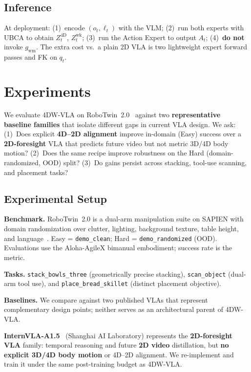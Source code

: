 \subsection{Inference}
\label{sec:inference}

At deployment: (1)~encode $(o_t, \ell_t)$ with the VLM; (2)~run both experts with UBCA to obtain $Z^{\mathrm{4D}}_t$, $Z^{\mathrm{wk}}_t$; (3)~run the Action Expert to output $A_t$; (4)~\textbf{do not} invoke $g_{\mathrm{wm}}$. The extra cost vs.\ a plain 2D VLA is two lightweight expert forward passes and FK on $q_t$.

\section{Experiments}
\label{sec:experiments}

We evaluate 4DW-VLA on RoboTwin~2.0~\cite{chen2025robotwin2} against two \textbf{representative baseline families} that isolate different gaps in current VLA design. We ask: (1)~Does explicit \textbf{4D--2D alignment} improve in-domain (Easy) success over a \textbf{2D-foresight} VLA that predicts future video but not metric 3D/4D body motion? (2)~Does the same recipe improve robustness on the Hard (domain-randomized, OOD) split? (3)~Do gains persist across stacking, tool-use scanning, and placement tasks?

\subsection{Experimental Setup}

\textbf{Benchmark.} RoboTwin~2.0 is a dual-arm manipulation suite on SAPIEN with domain randomization over clutter, lighting, background texture, table height, and language~\cite{chen2025robotwin2}. Easy = \texttt{demo\_clean}; Hard = \texttt{demo\_randomized} (OOD). Evaluations use the Aloha-AgileX bimanual embodiment; success rate is the metric.

\textbf{Tasks.} \texttt{stack\_bowls\_three} (geometrically precise stacking), \texttt{scan\_object} (dual-arm tool use), and \texttt{place\_bread\_skillet} (distinct placement objective).

\textbf{Baselines.} We compare against two published VLAs that represent complementary design points; neither serves as an architectural parent of 4DW-VLA.

\textbf{InternVLA-A1.5}~\cite{internvla15} (Shanghai AI Laboratory) represents the \textbf{2D-foresight VLA} family: temporal reasoning and future \textbf{2D video} distillation, but \textbf{no explicit 3D/4D body motion} or 4D--2D alignment. We re-implement and train it under the same post-training budget as 4DW-VLA.

